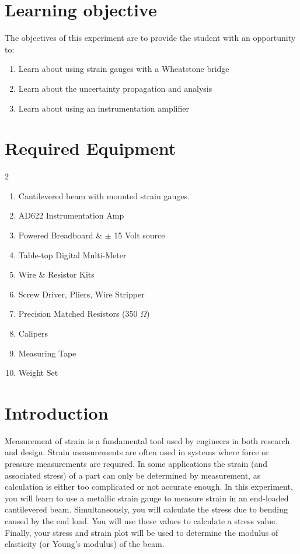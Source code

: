 \documentclass{article} %
\begin{document}

\clearpage

\section{Learning objective}
The objectives of this experiment are to provide the student with an opportunity to:

\begin{enumerate}
    \item Learn about using strain gauges with a Wheatstone bridge
    \item Learn about the uncertainty propagation and analysis
    \item Learn about using an instrumentation amplifier
\end{enumerate}

\section{Required Equipment}
\begin{multicols}{2}
    \begin{enumerate}
        \item Cantilevered beam with mounted strain gauges.
        \item AD622 Instrumentation Amp
        \item Powered Breadboard \& $\pm$ 15 Volt source
        \item Table-top Digital Multi-Meter
        \item Wire \& Resistor Kits
        \item Screw Driver, Pliers, Wire Stripper
        \item Precision Matched Resistors (350 $\Omega$)
        \item Calipers
        \item Measuring Tape
        \item Weight Set
    \end{enumerate}
\end{multicols}

\section{Introduction}
Measurement of strain is a fundamental tool used by engineers in both research and design. Strain measurements are often used in systems where force or pressure measurements are required. In some applications the strain (and associated stress) of a part can only be determined by measurement, as calculation is either too complicated or not accurate enough. In this experiment, you will learn to use a metallic strain gauge to measure strain in an end-loaded cantilevered beam. Simultaneously, you will calculate the stress due to bending caused by the end load. You will use these values to calculate a stress value. Finally, your stress and strain plot will be used to determine the modulus of elasticity (or Young’s modulus) of the beam. \\
\end{document}
